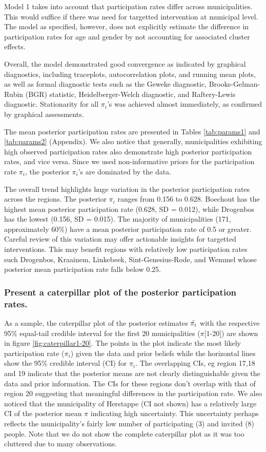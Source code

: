 \documentclass[12pt]{article}
\begin{document}
Model 1 takes into account that participation rates differ across municipalities. This would suffice if there was need for targetted intervention at municipal level. The model as specified, however, does not explicitly estimate the difference in participation rates for age and gender by not accounting for associated cluster effects. 

Overall, the model demonstrated good convergence as indicated by graphical diagnostics, including traceplots, autocorrelation plots, and running mean plots, as well as formal diagnostic tests such as the Geweke diagnostic, Brooks-Gelman-Rubin (BGR) statistic, Heidelberger-Welch diagnostic, and Raftery-Lewis diagnostic.  Stationarity for all  $\pi_i$'s was achieved almost immediately, as confirmed by graphical assessments.

The mean posterior participation rates are presented in Tables \ref{tab:params1} and \ref{tab:params2} (Appendix). We also notice that generally, municipalities exhibiting high observed participation rates also demonstrate high posterior participation rates, and vice versa. Since we used non-informative priors for the participation rate $\pi_i$, the posterior $\pi_i$'s are dominated by the data. 

The overall trend highlights huge variation in the posterior participation rates across the regions. The posterior $\pi_i$ ranges from 0.156 to 0.628. Boechout has the highest mean posterior participation rate (0.628, SD = 0.012), while Drogenbos has the lowest (0.156, SD = 0.015). The majority of municipalities (171, approximately 60\%) have a mean posterior participation rate of 0.5 or greater. Careful review of this variation may offer actionable insights for targetted interventions. This may benefit regions with relatively low participation rates such Drogenbos, Kraainem, Linkebeek, Sint-Genesius-Rode, and Wemmel whose posterior mean participation rate falls below 0.25.


\subsubsection{Present a caterpillar plot of the posterior participation rates.}

As a sample, the caterpillar plot of the posterior estimates $\Bar{\pi_i}$ with the respective 95\% equal-tail credible interval for the first 20 municipalities ($\pi$[1-20]) are shown in figure \ref{fig:caterpillar1-20}. The points in the plot indicate the most likely participation rate ($\pi_i$) given the data and prior beliefs while the horizontal lines show the 95\% credible interval (CI) for $\pi_i$. The overlapping CIs, eg region 17,18 and 19 indicate that the posterior means are not clearly distinguishable given the data and prior information. The CIs for these regions don't overlap with that of region 20 suggesting that meaningful differences in the participation rate. We also noticed that the municipality of Herstappe (CI not shown) has a relatively large CI of the posterior mean $\pi$ indicating high uncertainty. This uncertainty perhaps reflects the municipality's fairly low number of participating (3) and invited (8) people. Note that we do not show the complete caterpillar plot as it was too cluttered due to many observations. 
\end{document}
